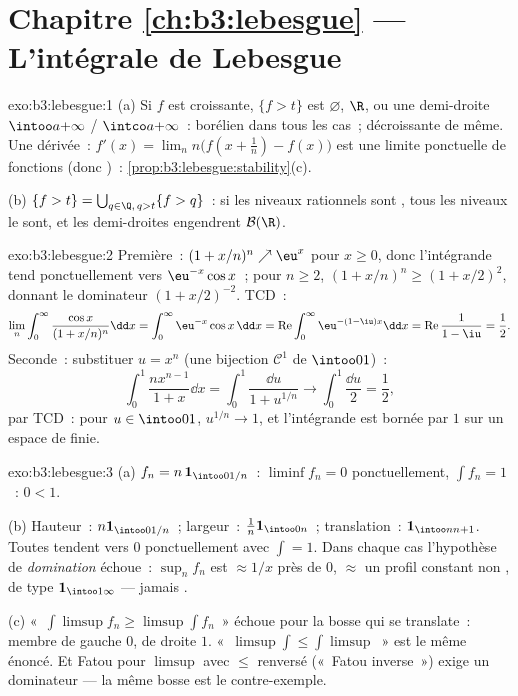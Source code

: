 \section*{Chapitre \ref{ch:b3:lebesgue} --- L'intégrale de
Lebesgue}

\begin{solution}{exo:b3:lebesgue:1}
(a) Si $f$ est croissante, $\{f > t\}$ est $\varnothing$,
$\R$, ou une demi-droite $\intoo a{+\infty}$ / $\intco
a{+\infty}$~: borélien dans tous les cas~; décroissante de
même. Une dérivée~: $f'(x) = \lim_n n\bigl(f(x + \frac1n)
- f(x)\bigr)$ est une limite ponctuelle de fonctions
 (donc )~:
\cref{prop:b3:lebesgue:stability}(c).

(b) $\{f > t\} = \bigcup_{q \in \Q,\, q > t}\{f > q\}$~: si
les niveaux rationnels sont , tous les niveaux le
sont, et les demi-droites engendrent $\mathcal B(\R)$.
\end{solution}

\begin{solution}{exo:b3:lebesgue:2}
Première~: $(1 + x/n)^n \nearrow \eu^x$ pour $x \geq 0$,
donc l'intégrande tend ponctuellement vers $\eu^{-x}\cos
x$~; pour $n \geq 2$, $(1 + x/n)^n \geq (1 + x/2)^2$,
donnant le dominateur  $(1 + x/2)^{-2}$. TCD~:
\[
\lim_n\int_0^\infty\frac{\cos x}{(1 + x/n)^n}\dd x
= \int_0^\infty \eu^{-x}\cos x\,\dd x
= \operatorname{Re}\int_0^\infty\eu^{-(1 - \iu)x}\dd x
= \operatorname{Re}\frac{1}{1 - \iu} = \frac12 .
\]
Seconde~: substituer $u = x^n$ (une bijection $\mathcal
C^1$ de $\intoo01$)~:
\[
\int_0^1\frac{nx^{n-1}}{1 + x}\dd x = \int_0^1\frac{\dd u}{1 +
u^{1/n}} \longrightarrow \int_0^1\frac{\dd u}{2} = \frac12,
\]
par TCD~: pour $u \in \intoo01$, $u^{1/n} \to 1$, et
l'intégrande est bornée par $1$ sur un espace de 
finie.
\end{solution}

\begin{solution}{exo:b3:lebesgue:3}
(a) $f_n = n\,\mathbf 1_{\intoo0{1/n}}$~: $\liminf f_n = 0$
ponctuellement, $\int f_n = 1$~: $0 < 1$.

(b) Hauteur~: $n\mathbf 1_{\intoo0{1/n}}$~; largeur~:
$\frac1n\mathbf 1_{\intoo0n}$~; translation~: $\mathbf
1_{\intoo n{n+1}}$. Toutes tendent vers $0$
ponctuellement avec $\int = 1$. Dans chaque cas l'hypothèse
de \emph{domination} échoue~: $\sup_nf_n$ est $\approx 1/x$
près de $0$, $\approx$ un profil constant non ,
de type $\mathbf 1_{\intoo1\infty}$ --- jamais .

(c) «~$\int\limsup f_n \geq \limsup\int f_n$~» échoue pour
la bosse qui se translate~: membre de gauche $0$, de droite
$1$. «~$\limsup\int \leq \int\limsup$~» est le même
énoncé. Et Fatou pour $\limsup$ avec $\leq$ renversé
(«~Fatou inverse~») exige un dominateur --- la même bosse
est le contre-exemple.
\end{solution}

